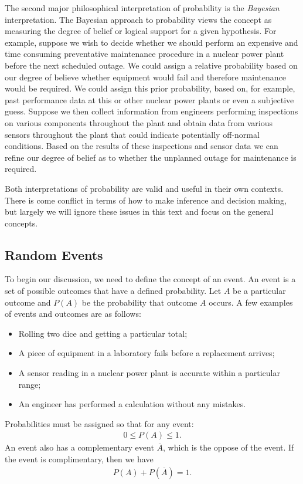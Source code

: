 The second major philosophical interpretation of probability is the \emph{Bayesian} interpretation. The Bayesian approach to probability views the concept as measuring the degree of belief or logical support for a given hypothesis. For example, suppose we wish to decide whether we should perform an expensive and time consuming preventative maintenance procedure in a nuclear power plant before the next scheduled outage. We could assign a relative probability based on our degree of believe whether equipment would fail and therefore maintenance would be required. We could assign this prior probability, based on, for example, past performance data at this or other nuclear power plants or even a subjective guess. Suppose we then collect information from engineers performing inspections on various components throughout the plant and obtain data from various sensors throughout the plant that could indicate potentially off-normal conditions. Based on the results of these inspections and sensor data we can refine our degree of belief as to whether the unplanned outage for maintenance is required.

Both interpretations of probability are valid and useful in their own contexts. There is come conflict in terms of how to make inference and decision making, but largely we will ignore these issues in this text and focus on the general concepts. 

\subsection{Random Events}

To begin our discussion, we need to define the concept of an event. An event is a set of possible outcomes that have a defined probability. Let $A$ be a particular outcome and $P(A)$ be the probability that outcome $A$ occurs. A few examples of events and outcomes are as follows:
\begin{itemize}
  \item Rolling two dice and getting a particular total;
  \item A piece of equipment in a laboratory fails before a replacement arrives;
  \item A sensor reading in a nuclear power plant is accurate within a particular range;
  \item An engineer has performed a calculation without any mistakes.
\end{itemize}
Probabilities must be assigned so that for any event:
\begin{align}
  0 \le P(A) \le 1 .
\end{align}
An event also has a complementary event $\overline{A}$, which is the oppose of the event. If the event is complimentary, then we have
\begin{align}
  P(A) + P(\overline{A}) = 1.
\end{align}

